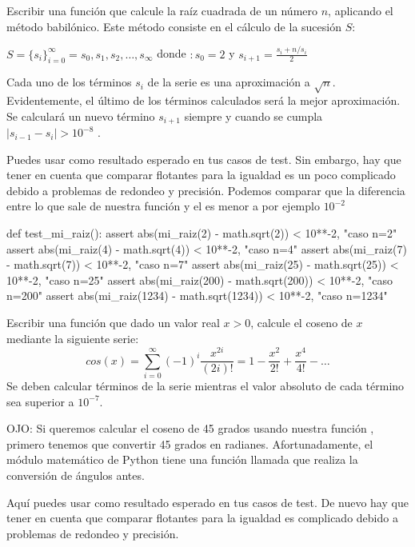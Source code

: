 \begin{ejercicio}
Escribir una función  que calcule la raíz cuadrada de un número $n$, aplicando el método babilónico. Este método consiste en el cálculo de la sucesión $S$:
\begin{center}
$S = \lbrace s_{i} \rbrace ^{\infty}_{i=0}= s_{0} , s_{1} , s_{2} , \dots , s_{\infty}$ donde $: s_{0} = 2 $    y   $ s_{i+1} = \frac {s_{i} + n/s_{i}}{2}$
\end{center}
Cada uno de los términos $s_{i}$ de la serie es una aproximación a $\sqrt{n}$. Evidentemente, el último de los términos calculados será la mejor aproximación. Se calculará un nuevo término $s_{i+1}$ siempre y cuando se cumpla $|s_{i-1} - s_{i} | > 10^{-8}$ .


Puedes usar  como resultado esperado en tus casos de test. Sin embargo, hay que tener en cuenta que comparar flotantes para la igualdad es un poco complicado debido a problemas de redondeo y precisión.
Podemos comparar que la diferencia entre lo que sale de nuestra función y el  es menor a por ejemplo $10^{-2}$

\begin{small}
\begin{python}
def test_mi_raiz():
    assert abs(mi_raiz(2) - math.sqrt(2)) < 10**-2, "caso n=2"
    assert abs(mi_raiz(4) - math.sqrt(4)) < 10**-2, "caso n=4"
    assert abs(mi_raiz(7) - math.sqrt(7)) < 10**-2, "caso n=7"
    assert abs(mi_raiz(25) - math.sqrt(25)) < 10**-2, "caso n=25"
    assert abs(mi_raiz(200) - math.sqrt(200)) < 10**-2, "caso n=200"
    assert abs(mi_raiz(1234) - math.sqrt(1234)) < 10**-2, "caso n=1234"
\end{python}
\end{small}
\end{ejercicio}



\begin{ejercicio}
Escribir una función  que dado un valor real $x > 0$, calcule el coseno de $x$ mediante la siguiente serie:
$$cos(x)=\sum_{i=0}^{\infty}(-1)^{i}\frac{x^{2i}}{(2i)!}= 1 - \frac{x^{2}}{2!} + \frac{x^{4}}{4!} - \dots$$
Se deben calcular términos de la serie mientras el valor absoluto de cada término sea superior a $10^{-7}$.

OJO: Si queremos calcular el coseno de 45 grados usando nuestra función , primero tenemos que convertir 45 grados en radianes. Afortunadamente, el módulo matemático de Python tiene una función llamada  que realiza la conversión de ángulos antes.

Aquí puedes usar  como resultado esperado en tus casos de test. De nuevo hay que tener en cuenta que comparar flotantes para la igualdad es complicado debido a problemas de redondeo y precisión.
\end{ejercicio}


